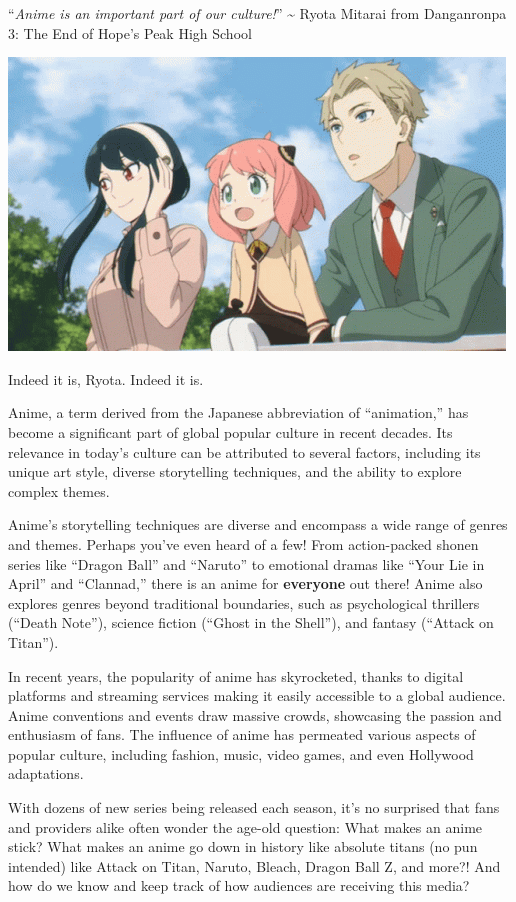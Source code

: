 \documentclass[
]{article}
\author{Breanna Richards}
\date{}
\begin{document}
``\emph{Anime is an important part of our culture!}'' \textasciitilde{}
Ryota Mitarai from Danganronpa 3: The End of Hope's Peak High School

\includegraphics{./img/spy-family.gif}

Indeed it is, Ryota. Indeed it is.

Anime, a term derived from the Japanese abbreviation of ``animation,''
has become a significant part of global popular culture in recent
decades. Its relevance in today's culture can be attributed to several
factors, including its unique art style, diverse storytelling
techniques, and the ability to explore complex themes.

Anime's storytelling techniques are diverse and encompass a wide range
of genres and themes. Perhaps you've even heard of a few! From
action-packed shonen series like ``Dragon Ball'' and ``Naruto'' to
emotional dramas like ``Your Lie in April'' and ``Clannad,'' there is an
anime for \textbf{everyone} out there! Anime also explores genres beyond
traditional boundaries, such as psychological thrillers (``Death
Note''), science fiction (``Ghost in the Shell''), and fantasy (``Attack
on Titan'').

In recent years, the popularity of anime has skyrocketed, thanks to
digital platforms and streaming services making it easily accessible to
a global audience. Anime conventions and events draw massive crowds,
showcasing the passion and enthusiasm of fans. The influence of anime
has permeated various aspects of popular culture, including fashion,
music, video games, and even Hollywood adaptations.

With dozens of new series being released each season, it's no surprised
that fans and providers alike often wonder the age-old question: What
makes an anime stick? What makes an anime go down in history like
absolute titans (no pun intended) like Attack on Titan, Naruto, Bleach,
Dragon Ball Z, and more?! And how do we know and keep track of how
audiences are receiving this media?
\end{document}
